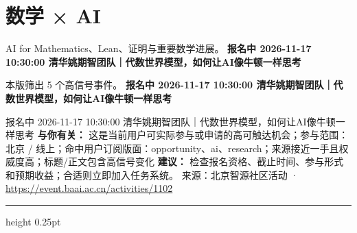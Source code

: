 \documentclass[10.5pt]{ctexart}
\begin{document}
\section*{数学 × AI}
{\color{ormuted} AI for Mathematics、Lean、证明与重要数学进展。}
\vspace{2mm}
{\LARGE\bfseries 报名中 2026-11-17 10:30:00 清华姚期智团队｜代数世界模型，如何让AI像牛顿一样思考}\par
\vspace{1mm}
{\color{ormuted} 本版筛出 5 个高信号事件。}
\vspace{3mm}
{\Large\bfseries 报名中 2026-11-17 10:30:00 清华姚期智团队｜代数世界模型，如何让AI像牛顿一样思考}\par
报名中 2026-11-17 10:30:00 清华姚期智团队｜代数世界模型，如何让AI像牛顿一样思考
\textbf{与你有关：} 这是当前用户可实际参与或申请的高可触达机会；参与范围：北京 / 线上；命中用户订阅版面：opportunity、ai、research；来源接近一手且权威度高；标题/正文包含高信号变化
\textbf{建议：} 检查报名资格、截止时间、参与形式和预期收益；合适则立即加入任务系统。
{\footnotesize\color{ormuted} 来源：北京智源社区活动 · \url{https://event.baai.ac.cn/activities/1102}}
\vspace{4mm}
\hrule height 0.25pt
\vspace{3mm}
\end{document}
